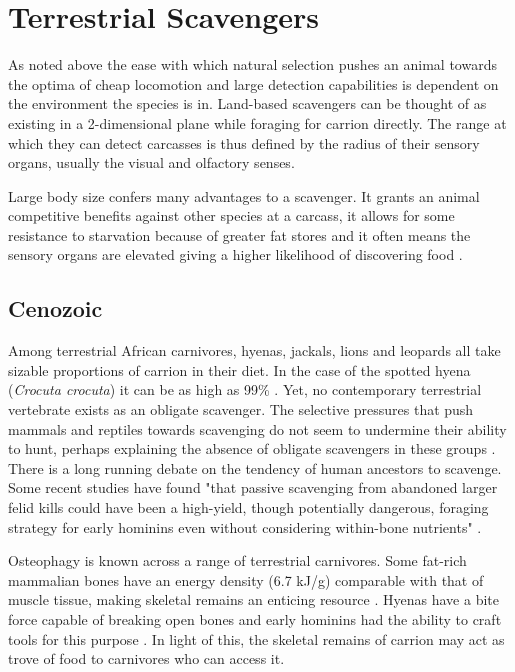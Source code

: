 \documentclass[a4paper,12pt]{article}
\begin{document}
\section{Terrestrial Scavengers}
As noted above the ease with which natural selection pushes an animal towards the optima of cheap locomotion and large detection capabilities is dependent on the environment the species is in. 
Land-based scavengers can be thought of as existing in a 2-dimensional plane while foraging for carrion directly. 
The range at which they can detect carcasses is thus defined by the radius of their sensory organs, usually the visual and olfactory senses. 

Large body size confers many advantages to a scavenger. 
It grants an animal competitive benefits against other species at a carcass, it allows for some resistance to starvation because of greater fat stores and it often means the sensory organs are elevated giving a higher likelihood of discovering food \citep{farlow1994speculations}.


\subsection*{Cenozoic}
Among terrestrial African carnivores, hyenas, jackals, lions and leopards all take sizable proportions of carrion in their diet.
In the case of the spotted hyena (\textit{Crocuta crocuta}) it can be as high as 99\% \citep{benbow2015introduction}. 
Yet, no contemporary terrestrial vertebrate exists as an obligate scavenger. 
The selective pressures that push mammals and reptiles towards scavenging do not seem to undermine their ability to hunt, perhaps explaining the absence of obligate scavengers in these groups \citep{ruxton2004obligate}.
\\There is a long running debate on the tendency of human ancestors to scavenge. 
Some recent studies have found "that passive scavenging from abandoned larger felid kills could have been a high-yield, though potentially dangerous, foraging strategy for early hominins even without considering within-bone nutrients" \citep{pobiner2015new}. 

Osteophagy is known across a range of terrestrial carnivores.
Some fat-rich mammalian bones have an energy density (6.7 kJ/g) comparable with that of muscle tissue, making skeletal remains an enticing resource \citep{brown1989study}. 
Hyenas have a bite force capable of breaking open bones and early hominins had the ability to craft tools for this purpose \citep{hone2010feeding,ARCM:ARCM12084}. 
In light of this, the skeletal remains of carrion may act as trove of food to carnivores who can access it.  
\end{document}
